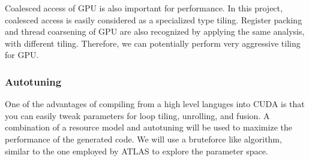 Coalesced access of GPU is also important for performance. In this
project, coalesced access is easily considered as a specialized type
tiling. Register packing and thread coarsening of GPU are also
recognized by applying the same analysis, with different tiling.
Therefore, we can potentially perform very aggressive tiling for GPU.

\subsubsection{Autotuning}\label{autotuning}

One of the advantages of compiling from a high level languges into CUDA
is that you can easily tweak parameters for loop tiling, unrolling, and
fusion. A combination of a resource model and autotuning will be used to
maximize the performance of the generated code. We will use a bruteforce
like algorithm, similar to the one employed by ATLAS\cite{atlas} to explore the
parameter space.